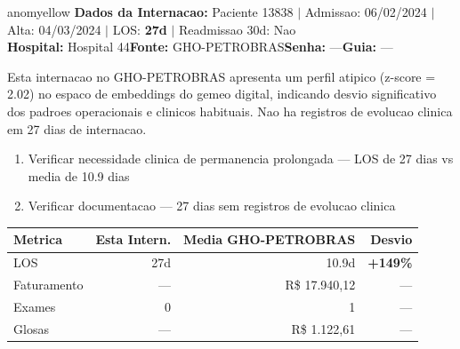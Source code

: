\documentclass[a4paper,10pt]{article}
\begin{document}
\begin{anomalycard}[Internacao 82080 | GHO-PETROBRAS | MODERADO (z=2.02)]{anomyellow}
\textbf{Dados da Internacao:} Paciente 13838 $\mid$ Admissao: 06/02/2024 $\mid$ Alta: 04/03/2024 $\mid$ LOS: \textbf{27d} $\mid$ Readmissao 30d: Nao\\
\textbf{Hospital:} Hospital 44\quad\textbf{Fonte:} GHO-PETROBRAS\quad\textbf{Senha:} ---\quad\textbf{Guia:} ---\\
\vspace{2pt}\begin{tcolorbox}[colback=severityred!20,colframe=anomyellow,title={\textbf{Interpretacao de Negocio}},fonttitle=\bfseries\small,left=4pt,right=4pt,top=3pt,bottom=3pt]
{\small Esta internacao no GHO-PETROBRAS apresenta um perfil atipico (z-score = 2.02) no espaco de embeddings do gemeo digital, indicando desvio significativo dos padroes operacionais e clinicos habituais. Nao ha registros de evolucao clinica em 27 dias de internacao.}
\end{tcolorbox}
\begin{tcolorbox}[colback=severityyellow!30,colframe=anomorange,title={\textbf{Recomendacoes Especificas}},fonttitle=\bfseries\small,left=4pt,right=4pt,top=3pt,bottom=3pt]
\begin{enumerate}[nosep,leftmargin=16pt]
\item {\small Verificar necessidade clinica de permanencia prolongada --- LOS de 27 dias vs media de 10.9 dias}
\item {\small Verificar documentacao --- 27 dias sem registros de evolucao clinica}
\end{enumerate}
\end{tcolorbox}
\begin{center}\begin{tabular}{l r r r}\toprule\textbf{Metrica} & \textbf{Esta Intern.} & \textbf{Media GHO-PETROBRAS} & \textbf{Desvio} \\\midrule
LOS & 27d & 10.9d & \textcolor{anomred}{\textbf{+149\%}} \\
Faturamento & --- & R\$ 17.940,12 & --- \\
Exames & 0 & 1 & --- \\
Glosas & --- & R\$ 1.122,61 & --- \\
\bottomrule\end{tabular}\end{center}


\end{anomalycard}
\end{document}
